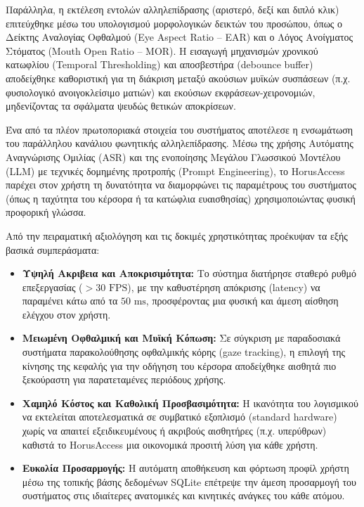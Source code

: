 \documentclass[twoside, a4paper, 11pt]{article}
\begin{document}
Παράλληλα, η εκτέλεση εντολών αλληλεπίδρασης (αριστερό, δεξί και διπλό κλικ) επιτεύχθηκε μέσω του υπολογισμού μορφολογικών δεικτών του προσώπου, όπως ο Δείκτης Αναλογίας Οφθαλμού (Eye Aspect Ratio -- EAR) και ο Λόγος Ανοίγματος Στόματος (Mouth Open Ratio -- MOR). Η εισαγωγή μηχανισμών χρονικού κατωφλίου (Temporal Thresholding) και αποσβεστήρα (debounce buffer) αποδείχθηκε καθοριστική για τη διάκριση μεταξύ ακούσιων μυϊκών συσπάσεων (π.χ. φυσιολογικό ανοιγοκλείσιμο ματιών) και εκούσιων εκφράσεων-χειρονομιών, μηδενίζοντας τα σφάλματα ψευδώς θετικών αποκρίσεων.

Ένα από τα πλέον πρωτοποριακά στοιχεία του συστήματος αποτέλεσε η ενσωμάτωση του παράλληλου κανάλιου φωνητικής αλληλεπίδρασης. Μέσω της χρήσης Αυτόματης Αναγνώρισης Ομιλίας (ASR) και της ενοποίησης Μεγάλου Γλωσσικού Μοντέλου (LLM) με τεχνικές δομημένης προτροπής (Prompt Engineering), το HorusAccess παρέχει στον χρήστη τη δυνατότητα να διαμορφώνει τις παραμέτρους του συστήματος (όπως η ταχύτητα του κέρσορα ή τα κατώφλια ευαισθησίας) χρησιμοποιώντας φυσική προφορική γλώσσα.

Από την πειραματική αξιολόγηση και τις δοκιμές χρηστικότητας προέκυψαν τα εξής βασικά συμπεράσματα:

\begin{itemize}
    \item \textbf{Υψηλή Ακριβεια και Αποκρισιμότητα:} Το σύστημα διατήρησε σταθερό ρυθμό επεξεργασίας ($>30 \text{ FPS}$), με την καθυστέρηση απόκρισης (latency) να παραμένει κάτω από τα $50 \text{ ms}$, προσφέροντας μια φυσική και άμεση αίσθηση ελέγχου στον χρήστη.
    \item \textbf{Μειωμένη Οφθαλμική και Μυϊκή Κόπωση:} Σε σύγκριση με παραδοσιακά συστήματα παρακολούθησης οφθαλμικής κόρης (gaze tracking), η επιλογή της κίνησης της κεφαλής για την οδήγηση του κέρσορα αποδείχθηκε αισθητά πιο ξεκούραστη για παρατεταμένες περιόδους χρήσης.
    \item \textbf{Χαμηλό Κόστος και Καθολική Προσβασιμότητα:} Η ικανότητα του λογισμικού να εκτελείται αποτελεσματικά σε συμβατικό εξοπλισμό (standard hardware) χωρίς να απαιτεί εξειδικευμένους ή ακριβούς αισθητήρες (π.χ. υπερύθρων) καθιστά το HorusAccess μια οικονομικά προσιτή λύση για κάθε χρήστη.
    \item \textbf{Ευκολία Προσαρμογής:} Η αυτόματη αποθήκευση και φόρτωση προφίλ χρήστη μέσω της τοπικής βάσης δεδομένων SQLite επέτρεψε την άμεση προσαρμογή του συστήματος στις ιδιαίτερες ανατομικές και κινητικές ανάγκες του κάθε ατόμου.
\end{itemize}
\end{document}
